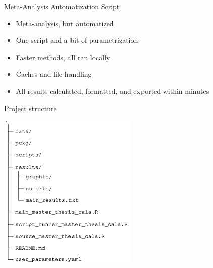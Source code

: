 \documentclass{beamer} %
\begin{document}
\begin{frame}{Meta-Analysis Automatization Script}

    \begin{itemize}
        \item Meta-analysis, but automatized
        \item One script and a bit of parametrization
        \item Faster methods, all ran locally
        \item Caches and file handling
        \item All results calculated, formatted, and exported within minutes
    \end{itemize}

\end{frame}


\begin{frame}{Project structure}

    \begin{flushleft}
        \includegraphics[width=0.5\textwidth]{Figures/project_structure.png}
    \end{flushleft}

\end{frame}

\end{document}
